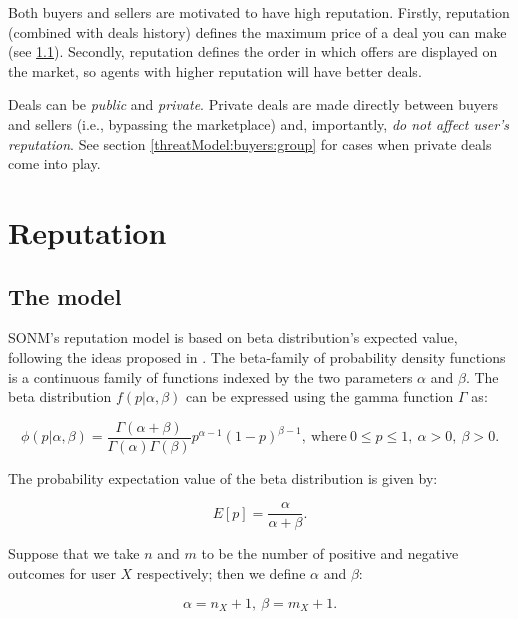 \documentclass[11pt]{article}
\begin{document}
Both buyers and sellers are motivated to have high reputation. Firstly, reputation (combined with deals history) defines the maximum price of a deal you can make (see \ref{reputation:theModel}). Secondly, reputation defines the order in which offers are displayed on the market, so agents with higher reputation will have better deals.

Deals can be \textit{public} and \textit{private}. Private deals are made directly between buyers and sellers (i.e., bypassing the marketplace) and, importantly, \textit{do not affect user's reputation}. See section \ref{threatModel:buyers:group} for cases when private deals come into play.

\section{Reputation} \label{reputation}

\subsection{The model} \label{reputation:theModel}

SONM's reputation model is based on beta distribution's expected value, following the ideas proposed in \cite{josang2002beta}. The beta-family of probability density functions is a continuous family of functions indexed by the two parameters $ \alpha $ and $ \beta $. The beta distribution $ f(p | \alpha, \beta) $ can be expressed using the gamma function $ \Gamma $ as:

\begin{equation} \label{betaDistribution}
\phi(p | \alpha, \beta) = \frac{\Gamma(\alpha + \beta)}{\Gamma(\alpha) \Gamma(\beta)} p^{\alpha - 1} (1 - p)^{\beta - 1},\ \text{where}\ 0 \leq p \leq 1,\ \alpha > 0,\ \beta > 0.
\end{equation}

The probability expectation value of the beta distribution is given by:

\begin{equation}
E[p] = \frac{\alpha}{\alpha + \beta}.
\end{equation}

Suppose that we take $ n $ and $ m $ to be the number of positive and negative outcomes for user $ X $ respectively; then we define $ \alpha $ and $ \beta $:

\begin{equation} \label{alphaBeta}
\alpha = n_{X} + 1,\ \beta = m_{X} + 1.
\end{equation}
\end{document}
